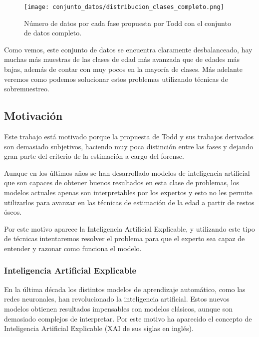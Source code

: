 
\begin{figure}[H]
	\centering
	\texttt{[image: conjunto\_datos/distribucion\_clases\_completo.png]}
	\caption{Número de datos por cada fase propuesta por Todd con el conjunto de datos completo.}
	\label{fig:conteo_original}
\end{figure}


Como vemos, este conjunto de datos se encuentra claramente desbalanceado, hay muchas más muestras de las clases de edad más avanzada que de edades más bajas, además de contar con muy pocos en la mayoría de clases. Más adelante veremos como podemos solucionar estos problemas utilizando técnicas de sobremuestreo.

\subsection{Motivación}

Este trabajo está motivado porque la propuesta de Todd y sus trabajos derivados son demasiado subjetivos, haciendo muy poca distinción entre las fases y dejando gran parte del criterio de la estimación a cargo del forense.

Aunque en los últimos años se han desarrollado modelos de inteligencia artificial que son capaces de obtener buenos resultados en esta clase de problemas, los modelos actuales apenas son interpretables por los expertos y esto no les permite utilizarlos para avanzar en las técnicas de estimación de la edad a partir de restos óseos.

Por este motivo aparece la Inteligencia Artificial Explicable, y utilizando este tipo de técnicas intentaremos resolver el problema para que el experto sea capaz de entender y razonar como funciona el modelo.


\subsubsection{Inteligencia Artificial Explicable}

En la última década los distintos modelos de aprendizaje automático, como las redes neuronales, han revolucionado la inteligencia artificial. Estos nuevos modelos obtienen resultados impensables con modelos clásicos, aunque son demasiado complejos de interpretar. Por este motivo ha aparecido el concepto de Inteligencia Artificial Explicable \cite{XAI} (XAI de sus siglas en inglés).

